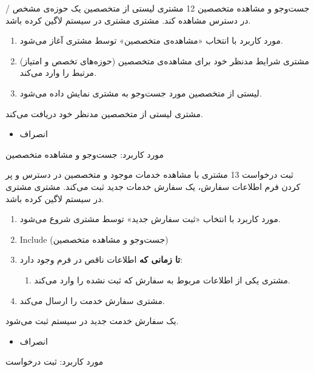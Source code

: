 {
\usecase
{جست‌وجو و مشاهده متخصصین}
{12}
{
	مشتری لیستی از متخصصین یک حوزه‌ی مشخص / در دسترس مشاهده کند.
}
{مشتری}
{}
{
	مشتری در سیستم لاگین کرده باشد.
}
{
	\vspace*{-0.6cm}
	\begin{enumerate}
		\item 
		مورد کاربرد با انتخاب «مشاهده‌ی متخصصین» توسط مشتری آغاز می‌شود.
		\item 
		مشتری شرایط مدنظر خود برای مشاهده‌ی متخصصین (حوزه‌های تخصص و امتیاز) مرتبط را وارد می‌کند.
		\item 
		لیستی از متخصصین مورد جست‌وجو به مشتری نمایش داده می‌شود.
	\end{enumerate}
}
{مشتری لیستی از متخصصین مدنظر خود دریافت می‌کند.}
{
	\begin{itemize}
		\vspace*{-0.6cm}
		\item انصراف
	\end{itemize}
}
{
	مورد کاربرد: جست‌وجو و مشاهده متخصصین
}

}

{
\usecase
{ثبت درخواست}
{13}
{
	مشتری با مشاهده خدمات موجود و متخصصین در دسترس و پر کردن فرم اطلاعات سفارش، یک سفارش خدمات جدید ثبت می‌کند.
}
{مشتری}
{}
{
	مشتری در سیستم لاگین کرده باشد.
}
{
	\vspace*{-0.6cm}
	\begin{enumerate}
		\item 
		مورد کاربرد با انتخاب «ثبت سفارش جدید» توسط مشتری شروع می‌شود.
		\item 
		Include (جست‌وجو و مشاهده متخصصین)
		\item 
		\textbf{تا زمانی که}
		اطلاعات ناقص در فرم وجود دارد:
		\begin{enumerate}[label=\theenumi.\arabic*.]
			\item 
			مشتری یکی از اطلاعات مربوط به سفارش که ثبت نشده را وارد می‌کند.
		\end{enumerate}
		\item 
		مشتری سفارش خدمت را ارسال می‌کند.
		
	\end{enumerate}
}
{یک سفارش خدمت جدید در سیستم ثبت می‌شود.}
{
	\begin{itemize}
		\vspace*{-0.6cm}
		\item انصراف
	\end{itemize}
}
{
	مورد کاربرد: ثبت درخواست
}


}



